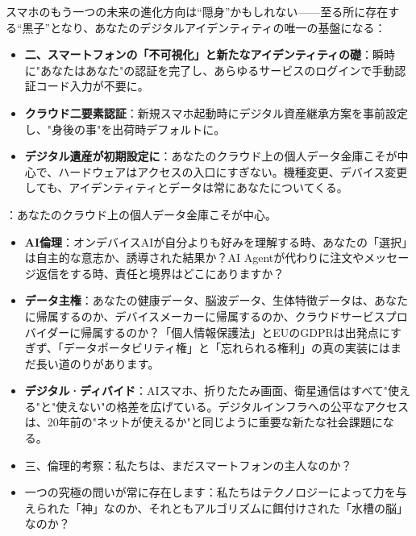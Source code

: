 
スマホのもう一つの未来の進化方向は“隠身”かもしれない——至る所に存在する“黒子”となり、あなたのデジタルアイデンティティの唯一の基盤になる：

\begin{itemize}
  \item \textbf{二、スマートフォンの「不可視化」と新たなアイデンティティの礎}：瞬時に"あなたはあなた"の認証を完了し、あらゆるサービスのログインで手動認証コード入力が不要に。
  \item \textbf{クラウド二要素認証}：新規スマホ起動時にデジタル資産継承方案を事前設定し、"身後の事"を出荷時デフォルトに。
  \item \textbf{デジタル遺産が初期設定に}：あなたのクラウド上の個人データ金庫こそが中心で、ハードウェアはアクセスの入口にすぎない。機種変更、デバイス変更しても、アイデンティティとデータは常にあなたについてくる。
\end{itemize}


：あなたのクラウド上の個人データ金庫こそが中心。

\begin{itemize}
  \item \textbf{AI倫理}：オンデバイスAIが自分よりも好みを理解する時、あなたの「選択」は自主的な意志か、誘導された結果か？AI Agentが代わりに注文やメッセージ返信をする時、責任と境界はどこにありますか？
  \item \textbf{データ主権}：あなたの健康データ、脳波データ、生体特徴データは、あなたに帰属するのか、デバイスメーカーに帰属するのか、クラウドサービスプロバイダーに帰属するのか？「個人情報保護法」とEUのGDPRは出発点にすぎず、「データポータビリティ権」と「忘れられる権利」の真の実装にはまだ長い道のりがあります。
  \item \textbf{デジタル·ディバイド}：AIスマホ、折りたたみ画面、衛星通信はすべて"使える"と"使えない"の格差を広げている。デジタルインフラへの公平なアクセスは、20年前の"ネットが使えるか"と同じように重要な新たな社会課題になる。
  \item 三、倫理的考察：私たちは、まだスマートフォンの主人なのか？
  \item 一つの究極の問いが常に存在します：私たちはテクノロジーによって力を与えられた「神」なのか、それともアルゴリズムに餌付けされた「水槽の脳」なのか？
\end{itemize}


